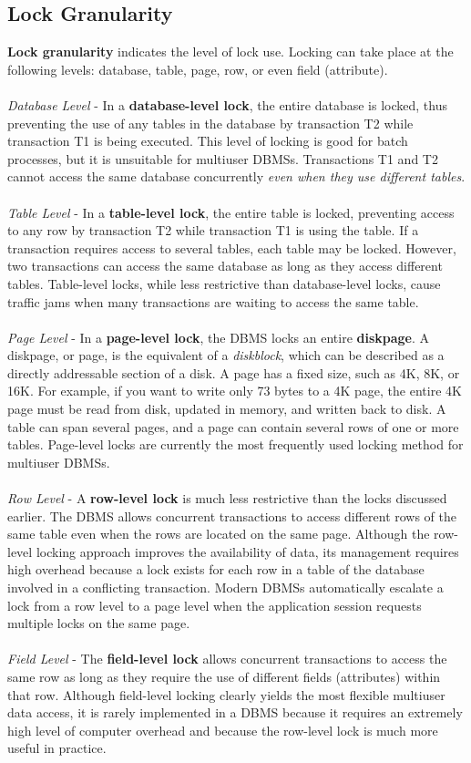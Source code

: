 \documentclass[a4paper, 11pt, titlepage]{report}
\begin{document}
\subsection{Lock Granularity}
\textbf{Lock granularity} indicates the level of lock use. Locking can take place at the following levels: database, table, page, row, or even field (attribute).\\\\
\textit{Database Level} - In a \textbf{database-level lock}, the entire database is locked, thus preventing the use of any tables in the database by transaction T2 while transaction T1 is being executed. This level of locking is good for batch processes, but it is unsuitable for multiuser DBMSs. Transactions T1 and T2 cannot access the same database concurrently \textit{even when they use different tables}.\\\\
\textit{Table Level} - In a \textbf{table-level lock}, the entire table is locked, preventing access to any row by transaction T2 while transaction T1 is using the table. If a transaction requires access to several tables, each table may be locked. However, two transactions can access the same database as long as they access different tables. Table-level locks, while less restrictive than database-level locks, cause traffic jams when many transactions are waiting to access the same table.\\\\
\textit{Page Level} - In a \textbf{page-level lock}, the DBMS locks an entire \textbf{diskpage}. A diskpage, or page, is the equivalent of a \textit{diskblock}, which can be described as a directly addressable section of a disk. A page has a fixed size, such as 4K, 8K, or 16K. For example, if you want to write only 73 bytes to a 4K page, the entire 4K page must be read from disk, updated in memory, and written back to disk. A table can span several pages, and a page can contain several rows of one or more tables. Page-level locks are currently the most frequently used locking method for multiuser DBMSs.\\\\
\textit{Row Level} - A \textbf{row-level lock} is much less restrictive than the locks discussed earlier.
The DBMS allows concurrent transactions to access different rows of the same table even when the rows are located on the same page. Although the row-level locking approach improves the availability of data, its management requires high overhead because a lock exists for each row in a table of the database involved in a conflicting transaction. Modern DBMSs automatically escalate a lock from a row level to a page level when the application session requests multiple locks on the same page.\\\\
\textit{Field Level} - The \textbf{field-level lock} allows concurrent transactions to access the same row as long as they require the use of different fields (attributes) within that row. Although field-level locking clearly yields the most flexible multiuser data access, it is rarely implemented in a DBMS because it requires an extremely high level of computer overhead and because the row-level lock is much more useful in practice.
\end{document}
